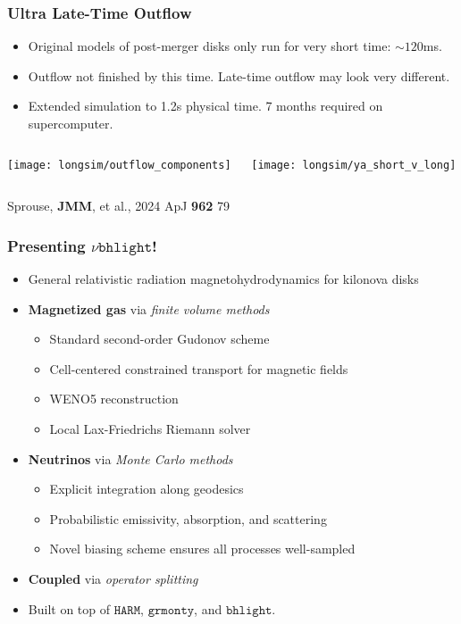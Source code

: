 \documentclass[]{beamer}
\begin{document}
\begin{frame}
  \frametitle{Ultra Late-Time Outflow}
  \begin{itemize}
  \item Original models of post-merger disks only run for very short
    time: $\sim 120$ms.
  \item Outflow not finished by this time. Late-time outflow may look
    very different.
  \item Extended simulation to 1.2s physical time. 7 months required
    on supercomputer.
  \end{itemize}
  \begin{columns}
    \begin{column}{6cm}
      \begin{center}
        \texttt{[image: longsim/outflow\_components]}
      \end{center}
    \end{column}
    \begin{column}{6cm}
      \begin{center}
        \texttt{[image: longsim/ya\_short\_v\_long]}
      \end{center}
    \end{column}
  \end{columns}
  {\footnotesize Sprouse, \textbf{JMM}, et al., 2024 ApJ \textbf{962} 79}
\end{frame}

\begin{frame}
  \frametitle{Presenting $\nu\texttt{bhlight}$!}
  \begin{itemize}
  \item General relativistic radiation magnetohydrodynamics for kilonova disks
  \item \textbf{Magnetized gas} via \textit{finite volume methods}
    \begin{itemize}
    \item Standard second-order Gudonov scheme
    \item Cell-centered constrained transport for magnetic fields
    \item WENO5 reconstruction
    \item Local Lax-Friedrichs Riemann solver
    \end{itemize}
  \item \textbf{Neutrinos} via \textit{Monte Carlo methods}
    \begin{itemize}
    \item Explicit integration along geodesics
    \item Probabilistic emissivity, absorption, and scattering
    \item Novel biasing scheme ensures all processes well-sampled
    \end{itemize}
  \item \textbf{Coupled} via \textit{operator splitting}
  \item Built on top of $\texttt{HARM}$, $\texttt{grmonty}$, and
    $\texttt{bhlight}$.
  \end{itemize}
\end{frame}
\end{document}
